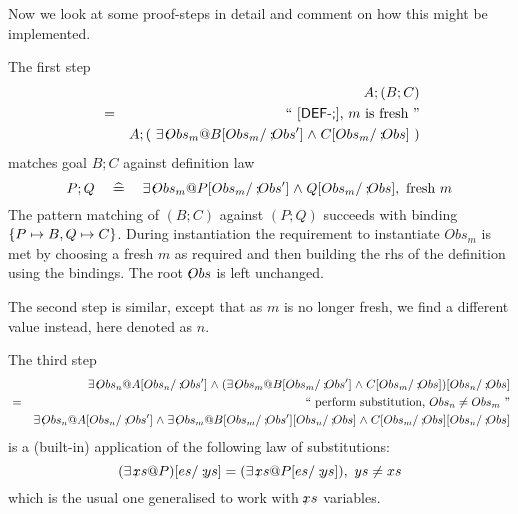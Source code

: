 Now we look at some proof-steps in detail
and comment on how this might be implemented.

The first step
\begin{eqnarray*}
  && A ; ( B ; C )
\EQ{\ecite{DEF-;}, $m$ is fresh}
\\&& A ; (~\exists \qsep  Obs_m @ B[Obs_m/\qsep Obs'] \land C[Obs_m/\qsep Obs]~)
\end{eqnarray*}
matches goal $B;C$ against definition law
\begin{equation*}
  P;Q
   ~~\defs~~
   \exists \qsep Obs_m @ P[Obs_m/\qsep Obs'] \land Q[Obs_m/\qsep Obs], \mbox{ fresh }m
\end{equation*}
The pattern matching of $(B;C)$ against $(P;Q)$ succeeds with binding
$\{P \mapsto B, Q \mapsto C\}$.
During instantiation the requirement to instantiate $Obs_m$
is met by choosing a fresh $m$ as required and then building the
rhs of the definition using the bindings. The root $\mathbin{;\!\!} Obs$
is left unchanged.

The second step is similar,
except that as $m$ is no longer fresh, we find a different value
instead, here denoted as $n$.

The third step
\begin{eqnarray*}
  && \exists \qsep Obs_n @ A[Obs_n/\qsep Obs']
     \land (\exists \qsep Obs_m @ B[Obs_m/\qsep Obs'] \land C[Obs_m/\qsep Obs])[Obs_n/\qsep Obs]
\EQ{perform substitution, $Obs_n \neq Obs_m$}
\\&& \exists \qsep Obs_n @ A[Obs_n/\qsep Obs']
     \land \exists \qsep Obs_m @ B[Obs_m/\qsep Obs'][Obs_n/\qsep Obs] \land C[Obs_m/\qsep Obs][Obs_n/\qsep Obs]
\end{eqnarray*}
is a (built-in) application of the following law of substitutions:
\begin{equation*}
 (\exists \qsep xs @ P)[es/\qsep ys]
 =
 (\exists \qsep xs @ P[es/\qsep ys]), ~ ys \neq xs
\end{equation*}
which is the usual one generalised to work with $\mathbin{;\!\!} xs$ variables.

